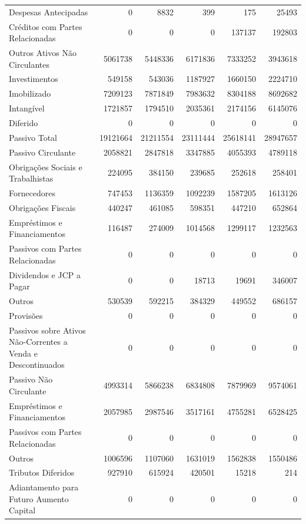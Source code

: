 \documentclass[grad,numbers]{coppe}
\begin{document}
\begin{longtable}[t]{>{\raggedright\arraybackslash}p{6cm}rrrrr}
  Despesas Antecipadas & 0 & 8832 & 399 & 175 & 25493\\
  Créditos com Partes Relacionadas & 0 & 0 & 0 & 137137 & 192803\\
  Outros Ativos Não Circulantes & 5061738 & 5448336 & 6171836 & 7333252 & 3943618\\
  \addlinespace
  Investimentos & 549158 & 543036 & 1187927 & 1660150 & 2224710\\
  Imobilizado & 7209123 & 7871849 & 7983632 & 8304188 & 8692682\\
  Intangível & 1721857 & 1794510 & 2035361 & 2174156 & 6145076\\
  Diferido & 0 & 0 & 0 & 0 & 0\\
  Passivo Total & 19121664 & 21211554 & 23111444 & 25618141 & 28947657\\
  \addlinespace
  Passivo Circulante & 2058821 & 2847818 & 3347885 & 4055393 & 4789118\\
  Obrigações Sociais e Trabalhistas & 224095 & 384150 & 239685 & 252618 & 258401\\
  Fornecedores & 747453 & 1136359 & 1092239 & 1587205 & 1613126\\
  Obrigações Fiscais & 440247 & 461085 & 598351 & 447210 & 652864\\
  Empréstimos e Financiamentos & 116487 & 274009 & 1014568 & 1299117 & 1232563\\
  \addlinespace
  Passivos com Partes Relacionadas & 0 & 0 & 0 & 0 & \vphantom{1} 0\\
  Dividendos e JCP a Pagar & 0 & 0 & 18713 & 19691 & 346007\\
  Outros & 530539 & 592215 & 384329 & 449552 & 686157\\
  Provisões & 0 & 0 & 0 & 0 & 0\\
  Passivos sobre Ativos Não-Correntes a Venda e Descontinuados & 0 & 0 & 0 & 0 & \vphantom{1} 0\\
  \addlinespace
  Passivo Não Circulante & 4993314 & 5866238 & 6834808 & 7879969 & 9574061\\
  Empréstimos e Financiamentos & 2057985 & 2987546 & 3517161 & 4755281 & 6528425\\
  Passivos com Partes Relacionadas & 0 & 0 & 0 & 0 & 0\\
  Outros & 1006596 & 1107060 & 1631019 & 1562838 & 1550486\\
  Tributos Diferidos & 927910 & 615924 & 420501 & 15218 & 214\\
  \addlinespace
  Adiantamento para Futuro Aumento Capital & 0 & 0 & 0 & 0 & \vphantom{1} 0\\

\end{longtable}
\end{document}
